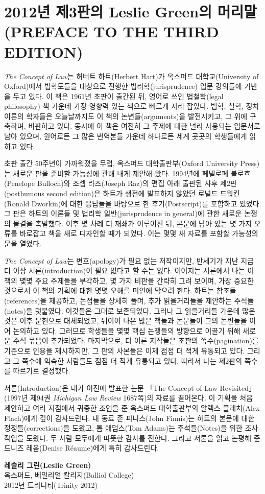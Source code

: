 \section{2012년 제3판의 Leslie Green의 머리말 (PREFACE TO THE THIRD
EDITION)}\label{uxb144-uxc81c3uxd310uxc758-leslie-greenuxc758-uxba38uxb9acuxb9d0-preface-to-the-third-edition}

{\small

\emph{The Concept of Law}는 허버트 하트(Herbert Hart)가 옥스퍼드
대학교(University of Oxford)에서 법학도들을 대상으로 진행한
법리학(jurisprudence) 입문 강의들에 기반을 두고 있다. 이 책은 1961년
초판이 출간된 뒤, 영어로 쓰인 법철학(legal philosophy) 책 가운데 가장
영향력 있는 책으로 빠르게 자리 잡았다. 법학, 철학, 정치이론의 학자들은
오늘날까지도 이 책의 논변들(arguments)을 발전시키고, 그 위에 구축하며,
비판하고 있다. 동시에 이 책은 여전히 그 주제에 대한 널리 사용되는
입문서로 남아 있으며, 원어로든 그 많은 번역본들 가운데 하나로든 세계
곳곳의 학생들에게 읽히고 있다.

초판 출간 50주년이 가까워졌을 무렵, 옥스퍼드 대학출판부(Oxford
University Press)는 새로운 판을 준비할 가능성에 관해 내게 제안해 왔다.
1994년에 페넬로페 불로흐(Penelope Bulloch)와 조셉 라즈(Joseph Raz)의
편집 아래 출판된 사후 제2판(posthumous second edition)은 하트가 생전에
발표하지 않았던 로널드 드워킨(Ronald Dworkin)에 대한 응답들을 바탕으로
한 후기(Postscript)를 포함하고 있었다. 그 판은 하트의 이론들 및 법리학
일반(jurisprudence in general)에 관한 새로운 논쟁의 물결을 촉발했다.
이후 몇 차례 더 재쇄가 이루어진 뒤, 본문에 남아 있는 몇 가지 오류를
바로잡고 책을 새로 디자인할 때가 되었다. 이는 몇몇 새 자료를 포함할
가능성의 문을 열었다.

\emph{The Concept of Law}는 변호(apology)가 필요 없는 저작이지만,
반세기가 지난 지금 더 이상 서론(introduction)이 필요 없다고 할 수는
없다. 이어지는 서론에서 나는 이 책의 몇몇 주요 주제들을 부각하고, 몇
가지 비판을 간략히 그려 보이며, 가장 중요한 것으로서 이 책의 기획에 대한
몇몇 오해를 미연에 막으려 한다. 하트는 참조들(references)을 제공하고,
논점들을 상세히 풀며, 추가 읽을거리들을 제안하는 주석들(notes)을
덧붙였다. 이것들은 그대로 보존되었다. 그러나 그 읽을거리들 가운데 많은
것은 이후 문헌으로 대체되었고, 뒤이어 나온 많은 책들과 논문들이 그의
논변들을 이어 논의하고 있다. 그러므로 학생들을 몇몇 핵심 논쟁들의
방향으로 이끌기 위해 새로운 주석 묶음이 추가되었다. 마지막으로, 더 이른
저작들은 초판의 쪽수(pagination)를 기준으로 인용을 제시하지만, 그 판의
사본들은 이제 점점 더 적게 유통되고 있다. 그리고 그 쪽수에 익숙한
사람들도 점점 더 적게 유통되고 있다. 따라서 나는 제2판의 쪽수를 따르기로
결정했다.

서론(Introduction)은 내가 이전에 발표한 논문 「The Concept of Law
Revisited」(1997년 제94권 \emph{Michigan Law Review} 1687쪽)의 자료를
끌어온다. 이 기획을 처음 제안하고 여러 지점에서 귀중한 조언을 준
옥스퍼드 대학출판부의 알렉스 플래치(Alex Flach)에게 깊이 감사드린다. 내
동료 존 피니스(John Finnis)는 하트의 본문에 대한 정정들(corrections)을
도왔고, 톰 애덤스(Tom Adams)는 주석들(Notes)을 위한 조사 작업을 도왔다.
두 사람 모두에게 따뜻한 감사를 전한다. 그리고 서론을 읽고 논평해 준
드니즈 레옴(Denise Réaume)에게 특히 감사드린다.

}

\vspace{1em}

\begin{flushright}
\textbf{레슬리 그린(Leslie Green)} 
\\ 옥스퍼드, 베일리얼 칼리지(Balliol College) 
\\ 2012년 트리니티(Trinity 2012)
\end{flushright}
